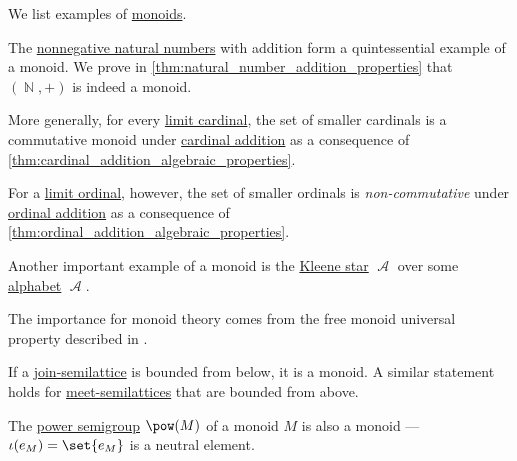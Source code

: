\begin{example}\label{ex:def:monoid}
  We list examples of \hyperref[def:monoid]{monoids}.

  \begin{thmenum}
     The \hyperref[def:natural_numbers]{nonnegative natural numbers} with addition form a quintessential example of a monoid. We prove in \cref{thm:natural_number_addition_properties} that \( (\BbbN, +) \) is indeed a monoid.

     More generally, for every \hyperref[def:successor_and_limit_cardinal]{limit cardinal}, the set of smaller cardinals is a commutative monoid under \hyperref[def:cardinal_addition]{cardinal addition} as a consequence of \cref{thm:cardinal_addition_algebraic_properties}.

     For a \hyperref[def:successor_and_limit_ordinal]{limit ordinal}, however, the set of smaller ordinals is \emph{non-commutative} under \hyperref[def:ordinal_addition]{ordinal addition} as a consequence of \cref{thm:ordinal_addition_algebraic_properties}.

     Another important example of a monoid is the \hyperref[def:formal_language/kleene_star]{Kleene star} \( \mscrA \) over some \hyperref[def:formal_language]{alphabet} \( \mscrA \).

    The importance for monoid theory comes from the free monoid universal property described in .

     If a \hyperref[def:semilattice]{join-semilattice} is bounded from below, it is a monoid. A similar statement holds for \hyperref[def:lattice]{meet-semilattices} that are bounded from above.

     The \hyperref[def:power_semigroup]{power semigroup} \( \pow(M) \) of a monoid \( M \) is also a monoid --- \( \iota(e_M) = \set{ e_M } \) is a neutral element.
  \end{thmenum}
\end{example}

